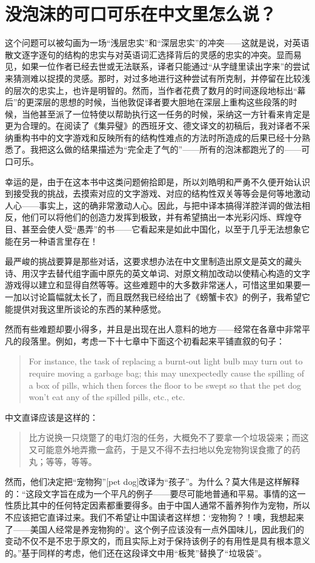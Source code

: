 \section{没泡沫的可口可乐在中文里怎么说？}

这个问题可以被勾画为一场“浅层忠实”和“深层忠实”的冲突——这就是说，对英语散文逐字逐句的结构的忠实与对英语词汇选择背后的灵感的忠实的冲突。显而易见，如果一位作者已经去世或无法联系，译者只能通过“从字缝里读出字来”的尝试来猜测难以捉摸的灵感。那时，对过多地进行这种尝试有所克制，并停留在比较浅的层次的忠实上，也许是明智的。然而，当作者花费了数月的时间逐段地标出“幕后”的更深层的思想的时候，当他敦促译者要大胆地在深层上重构这些段落的时候，当他甚至派了一位特使以帮助执行这一任务的时候，采纳这一方针看来肯定是更为合理的。在阅读了《集异璧》的西班牙文、德文译文的初稿后，我对译者不采纳重构书中的文字游戏和反映所有的结构性难点的方法时所造成的后果已经十分熟悉了。我把这么做的结果描述为“完全走了气的”——所有的泡沫都跑光了的——可口可乐。

幸运的是，由于在这本书中这类问题俯拾即是，所以刘皓明和严勇不久便开始认识到接受我的挑战，去摸索对应的文字游戏、对应的结构性双关等等会是何等地激动人心——事实上，这的确非常激动人心。因此，与把中译本搞得洋腔洋调的做法相反，他们可以将他们的创造力发挥到极致，并有希望搞出一本光彩闪烁、辉煌夺目、甚至会使人受“愚弄”的书——它看起来是如此中国化，以至于几乎无法想象它能在另一种语言里存在！

最严峻的挑战要算是那些对话，这要求想办法在中文里制造出原文是英文的藏头诗、用汉字去替代组字画中原先的英文单词、对原文稍加改动以使精心构造的文字游戏得以建立和显得自然等等。这些难题中的大多数非常迷人，可惜这里如果要一一加以讨论篇幅就太长了，而且既然我已经给出了《螃蟹卡农》的例子，我希望它能提供对我这里所谈论的东西的某种感觉。

然而有些难题却要小得多，并且是出现在出人意料的地方——经常在各章中非常平凡的段落里。例如，考虑一下十七章中下面这个初看起来平铺直叙的句子：
\begin{quote}
For instance, the task of replacing a burnt-out light bulb may turn out to require moving a garbage bag; this may unexpectedly cause the spilling of a box of pills, which then forces the floor to be swept so that the pet dog won't eat any of the spilled pills, etc., etc.
\end{quote}
中文直译应该是这样的：
\begin{quote}
比方说换一只烧蹩了的电灯泡的任务，大概免不了要拿一个垃圾袋来；而这又可能意外地弄撒一盒药，于是又不得不去扫地以免宠物狗误食撒了的药丸；等等，等等。
\end{quote}
然而，他们决定把“宠物狗”[pet dog]改译为“孩子”。为什么？莫大伟是这样解释的：“这段文字旨在成为一个平凡的例子——要尽可能地普通和平易。事情的这一性质比其中的任何特定因素都重要得多。由于中国人通常不蓄养狗作为宠物，所以不应该把它直译过来。我们不希望让中国读者这样想：‘宠物狗？！噢，我想起来了——美国人经常是养宠物狗的’。这个例子应该没有一点外国味儿，因此我们的变动不仅不是不忠于原文的，而且实际上对于保持该例子的有用性是具有根本意义的。”基于同样的考虑，他们还在这段译文中用“板凳”替换了“垃圾袋”。

